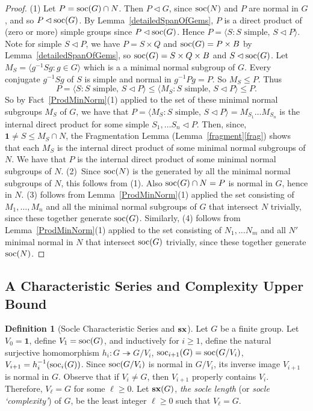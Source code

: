\documentclass[a4paper,11pt]{amsart}
\theoremstyle{definition}
\newtheorem{definition}[theorem]{Definition}
\newcommand{\sx}{{\bf sx}}
\newcommand{\soc}{\mbox{\rm soc}}
\newcommand{\sur}{\twoheadrightarrow}
\newcommand{\1}{{\mathbf 1}}
\begin{document}
\begin{proof}
(1) Let $ P=\soc(G) \cap N$.  Then $P \lhd G$, since $\soc(N)$ and $P$ are normal in $G$, and so $P \lhd \soc(G)$. 
By Lemma~\ref{detailedSpanOfGems}, $P$ is a direct product of (zero or more) simple groups since $P\lhd \soc(G)$. 
Hence $P=\langle S : S \mbox{ simple, }S\lhd P \rangle$.
Note for simple $S\lhd P$, we have $P=S \times Q$  and $\soc(G)=P \times B$ by Lemma~\ref{detailedSpanOfGems}, so $\soc(G)=S\times Q\times B$ and $S\lhd \soc(G)$.
Let $M_S=\langle g^{-1} S g : g \in G\rangle$ which is a a minimal normal subgroup of $G$. 
Every conjugate $g^{-1}Sg$ of $S$ is simple and normal in $g^{-1}Pg=P$.   So $M_S \leq P$.  Thus 
$$P = \langle S :  S \mbox{ simple, }S\lhd P \rangle \leq \langle M_S :  S \mbox{ simple, }S\lhd P \rangle \leq P.$$
So by Fact~\ref{ProdMinNorm}(1) applied to the set of these minimal normal subgroups $M_S$ of $G$, 
we have that $P= \langle M_S :  S \mbox{ simple, }S\lhd P \rangle=M_{S_1}\ldots M_{S_n}$ is the internal direct product for some simple $S_1, \ldots S_n \lhd P$.
 Then, since,  $\1\neq S \leq M_S \cap N$, 
the Fragmentation Lemma (Lemma~\ref{fragment}\ref{frag}) shows that each $M_S$ is the internal direct product of some minimal normal subgroups of $N$.
We have that $P$ is the internal direct product of some minimal normal subgroups of $N$.
(2)~Since $\soc(N)$ is the generated by all the minimal normal subgroups of $N$, this follows from (1). Also $\soc(G) \cap N=P$ is normal in $G$, hence in $N$.
(3) follows from Lemma~\ref{ProdMinNorm}(1) applied  the set consisting of
$M_1, \ldots, M_n$ and all the minimal normal subgroups of $G$ that intersect $N$ trivially, since these together generate $\soc(G)$. 
Similarly, (4) follows from  Lemma~\ref{ProdMinNorm}(1) applied to the set consisting of $N_1, \ldots N_m$ and all $N'$ minimal normal in $N$ that intersect $\soc(G)$ trivially, since these together generate  $\soc(N)$. 
\end{proof}



\subsection{A Characteristic Series and Complexity Upper Bound}
\label{socleSeries}


\begin{definition}[Socle Characteristic Series and $\sx$] \label{length} Let $G$ be a finite group.  Let $V_0=\1$,   
define  $V_1=\soc(G)$,  and inductively for $i \geq 1$, define the natural surjective homomorphism  $h_i: G\sur G/V_i$,  $\soc_{i+1}(G)=\soc(G/V_i)$, $V_{i+1}=h_i^{-1}(\soc_i(G))$.  Since $\soc(G/V_i)$ is normal in $G/V_i$, its inverse image $V_{i+1}$ is normal in $G$.
Observe that if $V_i\neq G$, then  $V_{i+1}$ properly contains $V_i$.  
Therefore, $V_{\ell}=G$ for some $\ell \geq 0$. Let $\sx(G)$, {\it the socle length} (or {\it socle `complexity'}) of $G$, be the least integer $\ell\geq 0$ such that $V_{\ell}=G$. 
\end{definition}
\end{document}
